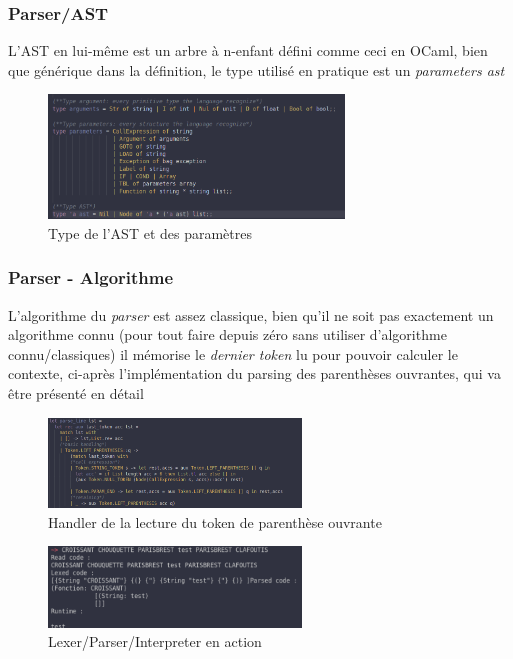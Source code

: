 \documentclass{beamer}
\begin{document}
    \begin{frame}
        \frametitle{Parser/AST}

        L'AST en lui-même est un arbre à n-enfant défini comme ceci en OCaml, bien que générique dans la définition, 
        le type utilisé en pratique est un \textit{parameters ast} 
        \begin{figure}[H]
            \center
            \includegraphics[width=0.7\textwidth]{img/type.png}
            \caption{Type de l'AST et des paramètres}
        \end{figure}
    \end{frame}

    \begin{frame}
        \frametitle{Parser - Algorithme}
        L'algorithme du \textit{parser} est assez classique, bien qu'il ne soit pas exactement un algorithme connu (pour tout faire depuis
        zéro sans utiliser d'algorithme connu/classiques) il mémorise le \textit{dernier token} lu
        pour pouvoir calculer le contexte, ci-après l'implémentation du parsing des parenthèses ouvrantes, qui va être présenté en détail
        \begin{figure}[H]
            \center
            \includegraphics[width=0.6\textwidth]{img/parenth.png}
            \caption{Handler de la lecture du token de parenthèse ouvrante}
        \end{figure}
        \begin{figure}[H]
            \center 
            \includegraphics[width=0.6\textwidth]{img/parserlexer.png}
            \caption{Lexer/Parser/Interpreter en action}
        \end{figure}
    \end{frame}
\end{document}

